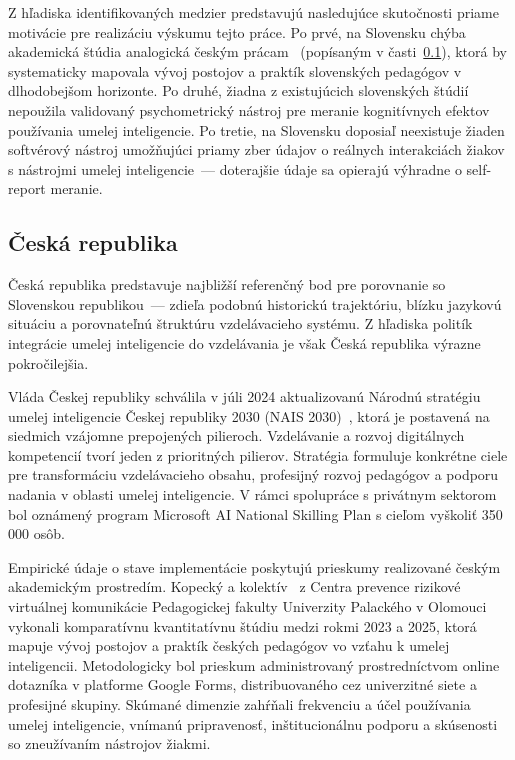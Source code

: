 Z hľadiska identifikovaných medzier predstavujú nasledujúce skutočnosti priame motivácie pre realizáciu výskumu tejto práce. Po prvé, na Slovensku chýba akademická štúdia analogická českým prácam~\cite{kopecky2026inevitable} (popísaným v časti~\ref{subsec:cr}), ktorá by systematicky mapovala vývoj postojov a praktík slovenských pedagógov v dlhodobejšom horizonte. Po druhé, žiadna z existujúcich slovenských štúdií nepoužila validovaný psychometrický nástroj pre meranie kognitívnych efektov používania umelej inteligencie. Po tretie, na Slovensku doposiaľ neexistuje žiaden softvérový nástroj umožňujúci priamy zber údajov o reálnych interakciách žiakov s nástrojmi umelej inteligencie~--- doterajšie údaje sa opierajú výhradne o self-report meranie.


\subsection{Česká republika}
\label{subsec:cr}

Česká republika predstavuje najbližší referenčný bod pre porovnanie so Slovenskou republikou~--- zdieľa podobnú historickú trajektóriu, blízku jazykovú situáciu a porovnateľnú štruktúru vzdelávacieho systému. Z hľadiska politík integrácie umelej inteligencie do vzdelávania je však Česká republika výrazne pokročilejšia.

Vláda Českej republiky schválila v júli 2024 aktualizovanú Národnú stratégiu umelej inteligencie Českej republiky 2030 (NAIS 2030)~\cite{nais2030}, ktorá je postavená na siedmich vzájomne prepojených pilieroch. Vzdelávanie a rozvoj digitálnych kompetencií tvorí jeden z prioritných pilierov. Stratégia formuluje konkrétne ciele pre transformáciu vzdelávacieho obsahu, profesijný rozvoj pedagógov a podporu nadania v oblasti umelej inteligencie. V rámci spolupráce s privátnym sektorom bol oznámený program Microsoft AI National Skilling Plan s cieľom vyškoliť 350\,000 osôb.

Empirické údaje o stave implementácie poskytujú prieskumy realizované českým akademickým prostredím. Kopecký a kolektív~\cite{kopecky2026inevitable} z Centra prevence rizikové virtuálnej komunikácie Pedagogickej fakulty Univerzity Palackého v Olomouci vykonali komparatívnu kvantitatívnu štúdiu medzi rokmi 2023 a 2025, ktorá mapuje vývoj postojov a praktík českých pedagógov vo vzťahu k umelej inteligencii. Metodologicky bol prieskum administrovaný prostredníctvom online dotazníka v platforme Google Forms, distribuovaného cez univerzitné siete a profesijné skupiny. Skúmané dimenzie zahŕňali frekvenciu a účel používania umelej inteligencie, vnímanú pripravenosť, inštitucionálnu podporu a skúsenosti so zneužívaním nástrojov žiakmi.

